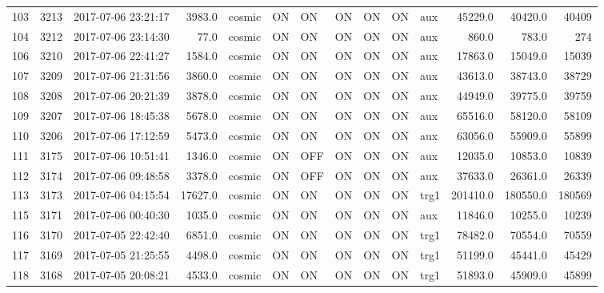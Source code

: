 \begin{tabular}{lrlrlllllllrrr}
103 &  3213 &  2017-07-06 23:21:17 &    3983.0 &   cosmic &  ON &   ON &   ON &  ON &   ON &       aux &     45229.0 &      40420.0 &               40409 \\
104 &  3212 &  2017-07-06 23:14:30 &      77.0 &   cosmic &  ON &   ON &   ON &  ON &   ON &       aux &       860.0 &        783.0 &                 274 \\
106 &  3210 &  2017-07-06 22:41:27 &    1584.0 &   cosmic &  ON &   ON &   ON &  ON &   ON &       aux &     17863.0 &      15049.0 &               15039 \\
107 &  3209 &  2017-07-06 21:31:56 &    3860.0 &   cosmic &  ON &   ON &   ON &  ON &   ON &       aux &     43613.0 &      38743.0 &               38729 \\
108 &  3208 &  2017-07-06 20:21:39 &    3878.0 &   cosmic &  ON &   ON &   ON &  ON &   ON &       aux &     44949.0 &      39775.0 &               39759 \\
109 &  3207 &  2017-07-06 18:45:38 &    5678.0 &   cosmic &  ON &   ON &   ON &  ON &   ON &       aux &     65516.0 &      58120.0 &               58109 \\
110 &  3206 &  2017-07-06 17:12:59 &    5473.0 &   cosmic &  ON &   ON &   ON &  ON &   ON &       aux &     63056.0 &      55909.0 &               55899 \\
111 &  3175 &  2017-07-06 10:51:41 &    1346.0 &   cosmic &  ON &  OFF &   ON &  ON &   ON &       aux &     12035.0 &      10853.0 &               10839 \\
112 &  3174 &  2017-07-06 09:48:58 &    3378.0 &   cosmic &  ON &  OFF &   ON &  ON &   ON &       aux &     37633.0 &      26361.0 &               26339 \\
113 &  3173 &  2017-07-06 04:15:54 &   17627.0 &   cosmic &  ON &   ON &   ON &  ON &   ON &      trg1 &    201410.0 &     180550.0 &              180569 \\
115 &  3171 &  2017-07-06 00:40:30 &    1035.0 &   cosmic &  ON &   ON &   ON &  ON &   ON &       aux &     11846.0 &      10255.0 &               10239 \\
116 &  3170 &  2017-07-05 22:42:40 &    6851.0 &   cosmic &  ON &   ON &   ON &  ON &   ON &      trg1 &     78482.0 &      70554.0 &               70559 \\
117 &  3169 &  2017-07-05 21:25:55 &    4498.0 &   cosmic &  ON &   ON &   ON &  ON &   ON &      trg1 &     51199.0 &      45441.0 &               45429 \\
118 &  3168 &  2017-07-05 20:08:21 &    4533.0 &   cosmic &  ON &   ON &   ON &  ON &   ON &      trg1 &     51893.0 &      45909.0 &               45899 \\

\end{tabular}
